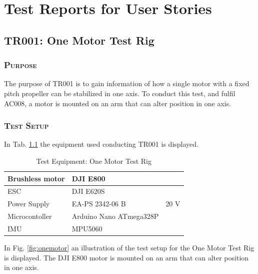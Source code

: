 \chapter{Test Reports for User Stories}
\section{TR001: One Motor Test Rig}
         {}

\subsection*{\textsc{\medium Purpose}}
The purpose of TR001 is to gain information of how a single motor with a fixed pitch propeller can be stabilized in one axis. To conduct this test, and fulfil AC008, a motor is mounted on an arm that can alter position in one axis. 

\subsection*{\textsc{\medium Test Setup}}
In Tab. \ref{tab:tabt1} the equipment used conducting TR001 is displayed. 
\begin {table}[H]
    \begin{center}
    \caption {Test Equipment: One Motor Test Rig} 
    \label{tab:tabt1} 
    \begin{tabular}{|l|l|l|}\hline 
        Brushless motor    & DJI E800   &\\ \hline
        ESC         & DJI E620S     &\\ \hline
        Power Supply & EA-PS 2342-06 B  & 20 V   \\ \hline
        Microcontoller & Arduino Nano ATmega328P &\\ \hline
        IMU & MPU5060 & \\ \hline
    \end{tabular}
    \end{center}
\end{table}


In Fig. \ref{fig:onemotor} an illustration of the test setup for the One Motor Test Rig is displayed. The DJI E800 motor is mounted on an arm that can alter position in one axis. 

